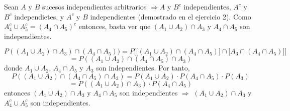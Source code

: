 \begin{sol}
\begin{enumerate}[label=(\roman*)]
      Sean $A$ y $B$ sucesos independientes arbitrarios $\Rightarrow A$ y $B^{c}$ independientes, $A^{c}$ y $B^{c}$ independietes, y $A^{c}$ y $B$ independientes (demostrado en el ejercicio 2). Como $A_{4}^{c} \cup A_{5}^{c} = (A_{4} \cap A_{5})^{c}$ entonces, basta ver que $(A_{1} \cup A_{2}) \cap A_{3}$ y $A_{4} \cap A_{5}$ son independientes.

      \[ 
        P ((A_{1} \cup A_{2}) \cap A_{3}) \cap ({A_{4}} \cap {A_{5}})) = P \Big [ \big [ (A_{1} \cup A_{2}) \cap (A_{4} \cap A_{5}) \big ] \cap \big [ A_{3} \cap (A_{4} \cap A_{5}) \big ] \Big ]
      \] 
      \[ 
        = P((A_{1} \cup A_{2}) \cap (A_{4} \cap A_{5}) \cap A_{3})
      \] 
      donde $A_{1} \cup A_{2}$, $A_{4} \cap A_{5}$ y $A_{3}$ son independientes. Por tanto,
      \[ 
        P((A_{1} \cup A_{2}) \cap (A_{4} \cap A_{5}) \cap A_{3}) = P(A_{1} \cup A_{2}) \cdot P(A_{4} \cap A_{5}) \cdot P(A_{3})
      \] 
      \[ 
        = P((A_{1} \cup A_{2}) \cap A_{3}) \cdot P(A_{4} \cap A_{5}) 
      \] 
      entonces $(A_{1} \cup A_{2}) \cap A_{3}$ y $A_{4} \cap A_{5}$ son independientes $\Rightarrow$ $(A_{1} \cup A_{2}) \cap A_{3}$ y $A_{4}^{c} \cup A_{5}^{c}$ son independientes.
  \end{enumerate}
\end{sol}
